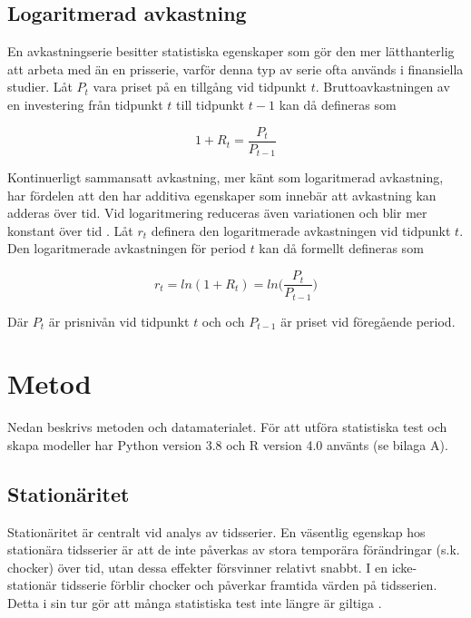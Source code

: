 \documentclass[11pt]{article}
\numberwithin{equation}{section}
\numberwithin{table}{section}
\numberwithin{figure}{section}
\begin{document}
\subsection{Logaritmerad avkastning}

En avkastningserie besitter statistiska egenskaper som gör den mer lätthanterlig att arbeta med än en prisserie, varför denna typ av serie ofta används i finansiella studier. Låt $P_{t}$ vara priset på en tillgång vid tidpunkt $t$. Bruttoavkastningen av en investering från tidpunkt $t$ till tidpunkt $t-1$ kan då defineras som

\begin{equation}
    1+R_{t} = \frac{P_{t}}{P_{t-1}}
\end{equation}


Kontinuerligt sammansatt avkastning, mer känt som logaritmerad avkastning, har fördelen att den har additiva egenskaper som innebär att avkastning kan adderas över tid.  Vid logaritmering reduceras även variationen och blir mer konstant över tid \parencite{tsay}. Låt $r_{t}$ definera den logaritmerade avkastningen vid tidpunkt $t$. Den logaritmerade avkastningen för period $t$ kan då formellt defineras som

\begin{equation}
    r_{t} = ln(1+R_{t}) = ln \Big( \frac{P_{t}}{P_{t-1}} \Big)
\end{equation}

Där $P_{t}$ är prisnivån vid tidpunkt $t$ och och $P_{t-1}$ är priset vid föregående period. 









\newpage
\section{Metod}
Nedan beskrivs metoden och datamaterialet. För att utföra statistiska test och skapa modeller har Python version 3.8 och R version 4.0 använts (se bilaga A). 

\subsection{Stationäritet}
Stationäritet är centralt vid analys av tidsserier. En väsentlig egenskap hos stationära tidsserier är att de inte påverkas av stora temporära förändringar (s.k. chocker) över tid, utan dessa effekter försvinner relativt snabbt. I en icke-stationär tidsserie förblir chocker och påverkar framtida värden på tidsserien. Detta i sin tur gör att många statistiska test inte längre är giltiga \parencite[][,s.329 f.]{montgomery2015forecasting}. \par
\end{document}

